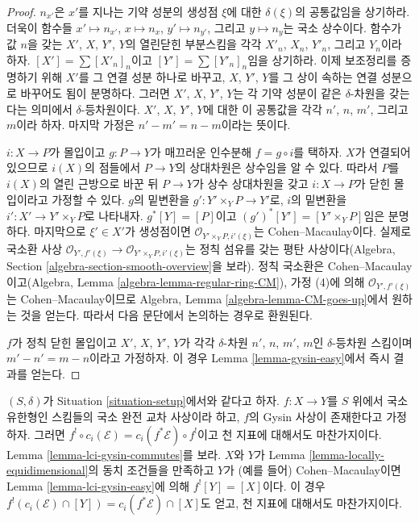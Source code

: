 \begin{proof}
$n_{x'}$은 $x'$를 지나는 기약 성분의 생성점 $\xi$에 대한
$\delta(\xi)$의 공통값임을 상기하라. 더욱이 함수들
$x' \mapsto n_{x'}$, $x \mapsto n_x$, $y' \mapsto n_{y'}$, 그리고
$y \mapsto n_y$는 국소 상수이다. 함수가 값 $n$을 갖는 $X'$, $X$,
$Y'$, $Y$의 열린닫힌 부분스킴을 각각 $X'_n$, $X_n$, $Y'_n$, 그리고
$Y_n$이라 하자. $[X'] = \sum [X'_n]_n$이고
$[Y'] = \sum [Y'_n]_n$임을 상기하라. 이제 보조정리를 증명하기 위해
$X'$를 그 연결 성분 하나로 바꾸고, $X$, $Y'$, $Y$를 그 상이 속하는
연결 성분으로 바꾸어도 됨이 분명하다. 그러면 $X'$, $X$, $Y'$, $Y$는
각 기약 성분이 같은 $\delta$-차원을 갖는다는 의미에서
$\delta$-등차원이다. $X'$, $X$, $Y'$, $Y$에 대한 이 공통값을 각각
$n'$, $n$, $m'$, 그리고 $m$이라 하자. 마지막 가정은
$n' - m' = n - m$이라는 뜻이다.

\medskip\noindent
$i : X \to P$가 몰입이고 $g : P \to Y$가 매끄러운 인수분해
$f = g \circ i$를 택하자. $X$가 연결되어 있으므로 $i(X)$의 점들에서
$P \to Y$의 상대차원은 상수임을 알 수 있다. 따라서 $P$를 $i(X)$의
열린 근방으로 바꾼 뒤 $P \to Y$가 상수 상대차원을 갖고
$i : X \to P$가 닫힌 몰입이라고 가정할 수 있다. $g$의 밑변환을
$g' : Y' \times_Y P \to Y'$로, $i$의 밑변환을
$i' : X' \to Y' \times_Y P$로 나타내자.
$g^*[Y] = [P]$이고 $(g')^*[Y'] = [Y' \times_Y P]$임은 분명하다.
마지막으로 $\xi' \in X'$가 생성점이면
$\mathcal{O}_{Y' \times_Y P, i'(\xi)}$는 Cohen--Macaulay이다. 실제로
국소환 사상
$\mathcal{O}_{Y', f'(\xi)} \to \mathcal{O}_{Y' \times_Y P, i'(\xi)}$는
정칙 섬유를 갖는 평탄 사상이다(Algebra, Section
\ref{algebra-section-smooth-overview}을 보라). 정칙 국소환은
Cohen--Macaulay이고(Algebra, Lemma \ref{algebra-lemma-regular-ring-CM}),
가정 (4)에 의해 $\mathcal{O}_{Y', f'(\xi)}$는 Cohen--Macaulay이므로
Algebra, Lemma \ref{algebra-lemma-CM-goes-up}에서 원하는 것을 얻는다.
따라서 다음 문단에서 논의하는 경우로 환원된다.

\medskip\noindent
$f$가 정칙 닫힌 몰입이고 $X'$, $X$, $Y'$, $Y$가 각각 $\delta$-차원
$n'$, $n$, $m'$, $m$인 $\delta$-등차원 스킴이며
$m' - n' = m - n$이라고 가정하자. 이 경우 Lemma
\ref{lemma-gysin-easy}에서 즉시 결과를 얻는다.
\end{proof}

\begin{remark}
\label{remark-gysin-chern-classes}
$(S, \delta)$가 Situation \ref{situation-setup}에서와 같다고 하자.
$f : X \to Y$를 $S$ 위에서 국소 유한형인 스킴들의 국소 완전 교차
사상이라 하고, $f$의 Gysin 사상이 존재한다고 가정하자. 그러면
$f^! \circ c_i(\mathcal{E}) = c_i(f^*\mathcal{E}) \circ f^!$이고 천
지표에 대해서도 마찬가지이다. Lemma
\ref{lemma-lci-gysin-commutes}를 보라. $X$와 $Y$가 Lemma
\ref{lemma-locally-equidimensional}의 동치 조건들을 만족하고 $Y$가
(예를 들어) Cohen--Macaulay이면 Lemma
\ref{lemma-lci-gysin-easy}에 의해 $f^![Y] = [X]$이다. 이 경우
$f^!(c_i(\mathcal{E}) \cap [Y]) = c_i(f^*\mathcal{E}) \cap [X]$도 얻고,
천 지표에 대해서도 마찬가지이다.
\end{remark}

